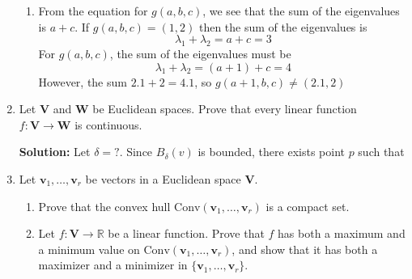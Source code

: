 \documentclass{report}
\newcommand{\solution}{\textbf{Solution: }}
\newcommand{\inner}[2]{\langle #1, #2 \rangle}
\begin{document}
\begin{enumerate}
\begin{enumerate}
		\item
		From the equation for $g(a,b,c)$, 
		we see that the sum of the eigenvalues is $a+c$.
		If $g(a,b,c) = (1,2)$ then the sum of the eigenvalues is 
		\[
			\lambda_1 + \lambda_2 = a+c = 3
		\]
		For $g(a,b,c)$, the sum of the eigenvalues must be 
		\[
			\lambda_1 + \lambda_2 =  (a+1)+c = 4
		\]
		However, the sum $2.1 + 2 = 4.1$, so
		$g(a+1,b,c) \neq (2.1,2)$	
	\end{enumerate}

	\medskip
	\item
	Let $\mathbf{V}$ and $\mathbf{W}$ be Euclidean spaces. Prove that every linear 
	function $f \colon \mathbf{V} \to \mathbf{W}$ is continuous.
	
	\solution
	Let $\delta = ?$.
	Since $B_\delta(v)$ is bounded, 
	there exists point $p$ such that



	
	\medskip
	\item
	Let $\mathbf{v}_1,\dots,\mathbf{v}_r$ be vectors in a Euclidean space $\mathbf{V}$. 
	
		\begin{enumerate}
		
		\smallskip
		\item
		Prove that the convex hull $\mathrm{Conv}(\mathbf{v}_1,\dots,\mathbf{v}_r)$ is a compact set.
		
		\smallskip
		\item
		Let $f \colon \mathbf{V} \to \mathbb{R}$ be a linear function. Prove that
		$f$ has both a maximum and a minimum value on $\mathrm{Conv}(\mathbf{v}_1,\dots,\mathbf{v}_r)$,
		and show that it has both a maximizer and a minimizer in $\{\mathbf{v}_1,\dots,\mathbf{v}_r\}$.
		
	\end{enumerate}
		
\end{enumerate}
\end{document}
